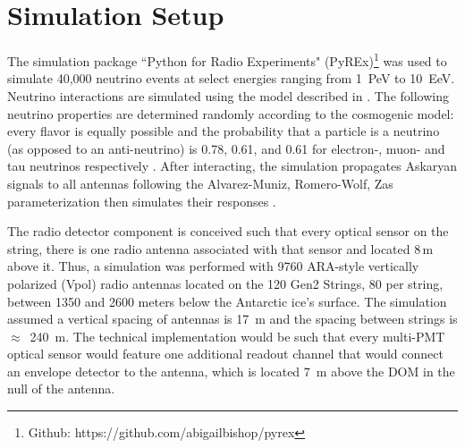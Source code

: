   

\section{Simulation Setup}

  The simulation package ``Python for Radio Experiments" (PyREx)\footnote{Github: https://github.com/abigailbishop/pyrex} was used to simulate 40,000 neutrino events at select  energies ranging from 1~PeV to 10~EeV. 
  Neutrino interactions are simulated using the model described in \citep{ctw-interaction}.
  The following neutrino properties are determined randomly according to the cosmogenic model: every flavor is equally possible and the probability that a particle is a neutrino (as opposed to an anti-neutrino) is 0.78, 0.61, and 0.61 for electron-, muon- and tau neutrinos respectively \citep{icecube_glashow}. 
  After interacting, the simulation propagates Askaryan signals to all antennas following the Alvarez-Muniz, Romero-Wolf, Zas parameterization then simulates their responses \citep{ARZ-signal}.

  The radio detector component is conceived such that every optical sensor on the string, there is one radio antenna associated 
  with that sensor and located 8\,m above it.
  Thus, a simulation was performed with 9760 ARA-style vertically polarized (Vpol) radio antennas located on the 120 Gen2 Strings, 80 per string, between 1350 and 2600 meters below the Antarctic ice's surface.  The simulation assumed a vertical spacing of antennas is 17~m and the spacing between strings is $\approx$~240~m.  
  The technical implementation would be such that every multi-PMT optical sensor would feature one additional readout channel that would connect an envelope detector to the antenna, which is located 7~m above the DOM in the null of the antenna.%
  
